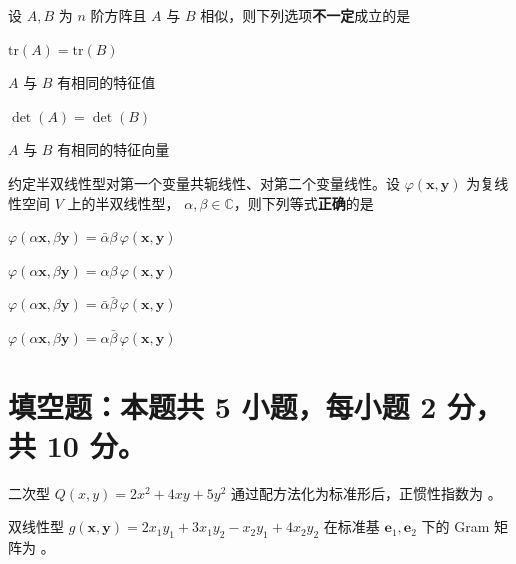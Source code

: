 \documentclass[11pt,a4paper]{exam-zh}
\newcommand{\bvec}[1]{\boldsymbol{#1}}
\newcommand{\tr}{\mathrm{tr}}
\newcommand{\C}{\mathbb{C}}
\begin{document}
\begin{question}
  设 $A, B$ 为 $n$ 阶方阵且 $A$ 与 $B$ 相似，则下列选项\textbf{不一定}成立的是
  \begin{choices}
    \item $\tr\left(A\right) = \tr\left(B\right)$
    \item $A$ 与 $B$ 有相同的特征值
    \item $\det\left(A\right) = \det\left(B\right)$
    \item $A$ 与 $B$ 有相同的特征向量
  \end{choices}
\end{question}

\begin{question}
  约定半双线性型对第一个变量共轭线性、对第二个变量线性。设
  $\varphi\left(\bvec{x}, \bvec{y}\right)$ 为复线性空间 $V$ 上的半双线性型，
  $\alpha,\beta\in\C$，则下列等式\textbf{正确}的是
  \begin{choices}
    \item $\varphi\left(\alpha\bvec{x},\beta\bvec{y}\right)
      = \bar{\alpha}\beta\,\varphi\left(\bvec{x},\bvec{y}\right)$
    \item $\varphi\left(\alpha\bvec{x},\beta\bvec{y}\right)
      = \alpha\beta\,\varphi\left(\bvec{x},\bvec{y}\right)$
    \item $\varphi\left(\alpha\bvec{x},\beta\bvec{y}\right)
      = \bar{\alpha}\bar{\beta}\,\varphi\left(\bvec{x},\bvec{y}\right)$
    \item $\varphi\left(\alpha\bvec{x},\beta\bvec{y}\right)
      = \alpha\bar{\beta}\,\varphi\left(\bvec{x},\bvec{y}\right)$
  \end{choices}
\end{question}


\section{填空题：本题共 5 小题，每小题 2 分，共 10 分。}

\begin{question}
  二次型 $Q\left(x, y\right) = 2x^2 + 4xy + 5y^2$ 通过配方法化为标准形后，正惯性指数为 \fillin 。
\end{question}

\begin{question}
  双线性型 $g\left(\bvec{x}, \bvec{y}\right) = 2x_1y_1 + 3x_1y_2 - x_2y_1 + 4x_2y_2$ 在标准基 $\bvec{e}_1, \bvec{e}_2$ 下的 Gram 矩阵为 \fillin 。
\end{question}
\end{document}
